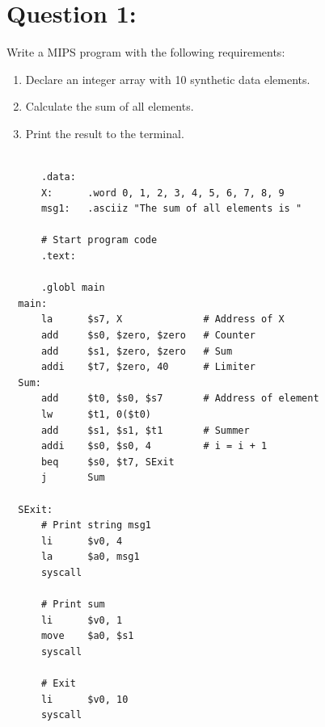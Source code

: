 \documentclass[12pt,a4paper]{article}
\begin{document}
\begin{titlepage}
\begin{center}
\begin{minipage}{0.4\textwidth}
\begin{flushright}
      \end{flushright}
    \end{minipage}

    \vfill

    \vspace{2cm}
    {\large} %
  \end{center}
\end{titlepage}


\section*{Question 1:}
Write a MIPS program with the following requirements:
\begin{enumerate}[label=\alph*.]
  \item Declare an integer array with 10 synthetic data elements.
  \item Calculate the sum of all elements.
  \item Print the result to the terminal.
\end{enumerate}

\begin{mdframed}[hidealllines=true,backgroundcolor=magenta!10]
  \begin{lstlisting}

      .data:
      X:      .word 0, 1, 2, 3, 4, 5, 6, 7, 8, 9
      msg1:   .asciiz "The sum of all elements is "

      # Start program code
      .text:

      .globl main
  main:
      la      $s7, X              # Address of X
      add     $s0, $zero, $zero   # Counter
      add     $s1, $zero, $zero   # Sum
      addi    $t7, $zero, 40      # Limiter
  Sum:
      add     $t0, $s0, $s7       # Address of element
      lw      $t1, 0($t0)
      add     $s1, $s1, $t1       # Summer
      addi    $s0, $s0, 4         # i = i + 1
      beq     $s0, $t7, SExit
      j       Sum

  SExit:
      # Print string msg1
      li      $v0, 4
      la      $a0, msg1
      syscall

      # Print sum
      li      $v0, 1
      move    $a0, $s1
      syscall

      # Exit
      li      $v0, 10
      syscall

  \end{lstlisting}
\end{mdframed}
\end{document}
